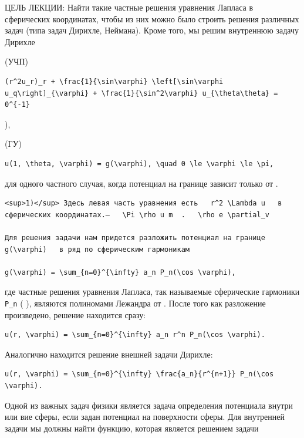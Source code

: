 \documentclass[
  ukrainian,
]{article}
\begin{document}
ЦЕЛЬ ЛЕКЦИИ: Найти такие частные решения уравнения Лапласа в сферических
координатах, чтобы из них можно было строить решения различных задач
(типа задач Дирихле, Неймана). Кроме того, мы решим внутреннюю задачу
Дирихле

(УЧП)

\begin{verbatim}
(r^2u_r)_r + \frac{1}{\sin\varphi} \left[\sin\varphi u_q\right]_{\varphi} + \frac{1}{\sin^2\varphi} u_{\theta\theta} = 0^{-1}
\end{verbatim}

),

(ГУ)

\begin{verbatim}
u(1, \theta, \varphi) = g(\varphi), \quad 0 \le \varphi \le \pi,
\end{verbatim}

для одного частного случая, когда потенциал на границе зависит только от
\phi  .

\begin{verbatim}
<sup>1)</sup> Здесь левая часть уравнения есть   r^2 \Lambda u   в сферических координатах.—   \Pi \rho u m  .   \rho e \partial_v

Для решения задачи нам придется разложить потенциал на границе   g(\varphi)   в ряд по сферическим гармоникам

g(\varphi) = \sum_{n=0}^{\infty} a_n P_n(\cos \varphi),
\end{verbatim}

где частные решения уравнения Лапласа, так называемые сферические
гармоники \texttt{P\_n} ( \cos \varphi  ), являются полиномами Лежандра
от \cos \varphi  . После того как разложение произведено, решение
находится сразу:

\begin{verbatim}
u(r, \varphi) = \sum_{n=0}^{\infty} a_n r^n P_n(\cos \varphi).
\end{verbatim}

Аналогично находится решение внешней задачи Дирихле:

\begin{verbatim}
u(r, \varphi) = \sum_{n=0}^{\infty} \frac{a_n}{r^{n+1}} P_n(\cos \varphi).
\end{verbatim}

Одной из важных задач физики является задача определения потенциала
внутри или вие сферы, если задан потенциал на поверхности сферы. Для
внутренней задачи мы должны найти функцию, которая является решением
задачи
\end{document}
